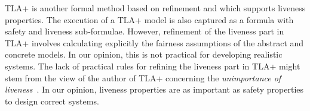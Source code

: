 %
%
%
TLA+\cite{DBLP_books_aw_Lamport2002} is another formal method based on
refinement and which supports liveness properties.  The
execution of a TLA+ model is also captured as a formula with safety
and liveness sub-formulae.  However, refinement of the liveness part
in TLA+ involves calculating explicitly the fairness assumptions of the
abstract and concrete models.  In our opinion, this is not practical for 
developing realistic systems.  The
lack of practical rules for refining the liveness part in TLA+ might 
stem from the view of the author of TLA+ concerning the
\emph{unimportance of liveness}~\cite[Chapter
8]{DBLP_books_aw_Lamport2002}.  In our opinion, liveness
properties are as important as safety properties to design
correct systems.

